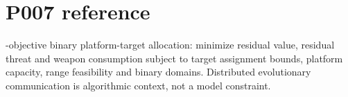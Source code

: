 \section*{P007 reference}\nThree-objective binary platform-target allocation: minimize residual value, residual threat and weapon consumption subject to target assignment bounds, platform capacity, range feasibility and binary domains. Distributed evolutionary communication is algorithmic context, not a model constraint.\n